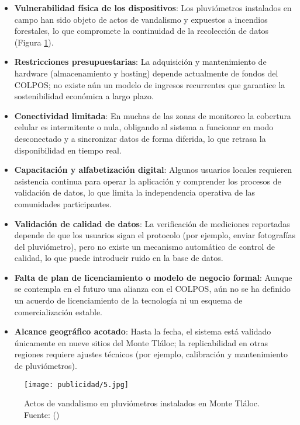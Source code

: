 \begin{itemize}
  \item \textbf{Vulnerabilidad física de los dispositivos}: Los pluviómetros instalados en campo han sido objeto de actos de vandalismo y expuestos a incendios forestales, lo que compromete la continuidad de la recolección de datos (Figura \ref{publicidad5}).  
  \item \textbf{Restricciones presupuestarias}: La adquisición y mantenimiento de hardware (almacenamiento y hosting) depende actualmente de fondos del COLPOS; no existe aún un modelo de ingresos recurrentes que garantice la sostenibilidad económica a largo plazo.  
  \item \textbf{Conectividad limitada}: En muchas de las zonas de monitoreo la cobertura celular es intermitente o nula, obligando al sistema a funcionar en modo desconectado y a sincronizar datos de forma diferida, lo que retrasa la disponibilidad en tiempo real.  
  \item \textbf{Capacitación y alfabetización digital}: Algunos usuarios locales requieren asistencia continua para operar la aplicación y comprender los procesos de validación de datos, lo que limita la independencia operativa de las comunidades participantes.  
  \item \textbf{Validación de calidad de datos}: La verificación de mediciones reportadas depende de que los usuarios sigan el protocolo (por ejemplo, enviar fotografías del pluviómetro), pero no existe un mecanismo automático de control de calidad, lo que puede introducir ruido en la base de datos.  
  \item \textbf{Falta de plan de licenciamiento o modelo de negocio formal}: Aunque se contempla en el futuro una alianza con el COLPOS, aún no se ha definido un acuerdo de licenciamiento de la tecnología ni un esquema de comercialización estable.  
  \item \textbf{Alcance geográfico acotado}: Hasta la fecha, el sistema está validado únicamente en nueve sitios del Monte Tláloc; la replicabilidad en otras regiones requiere ajustes técnicos (por ejemplo, calibración y mantenimiento de pluviómetros).  
\end{itemize}

\begin{figure}[h!]
\centering
  \texttt{[image: publicidad/5.jpg]}
  \caption{Actos de vandalismo en pluviómetros instalados en Monte Tláloc. Fuente: (\cite{Informativonacional2025})}
  \label{publicidad5}
\end{figure}



